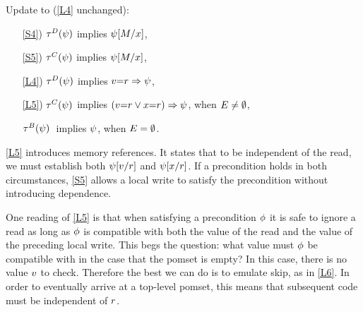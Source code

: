 
\begin{definition}[\xLIR]
  \label{def:pomsets-lir}
  Update  to (\ref{L4} unchanged):
  \begin{enumerate}
  \item[\ref{S4})]
    $\aTr{\bEvs}{\bForm}$ implies $\psi[M/x]$,
  \item[\ref{S5})]
    $\aTr{\cEvs}{\bForm}$ implies $\psi[M/x]$,
  \item[\ref{L4})]
    $\aTr{\bEvs}{\bForm}$ implies $v{=}r\Rightarrow\psi$, 
  \item[\ref{L5})]
    $\aTr{\cEvs}{\bForm}$ implies
    $(v{=}r\lor x{=}r)\Rightarrow\psi$, when $E\neq\emptyset$,
  \item[{\labeltext[L6]{L6)}{L6}}] 
    $\aTr{\dEvs}{\bForm}\;$ implies $\psi$, when $E=\emptyset$.
  \end{enumerate}
\end{definition}

\ref{L5} introduces memory references.  It states that to be independent of
the read, we must establish both $\psi[v/r]$ and $\psi[x/r]$.
If a precondition holds in both circumstances, \ref{S5} allows a local write
to satisfy the precondition without introducing dependence.

One reading of \ref{L5} is that when satisfying a precondition $\phi$ it is
safe to ignore a read as long as $\phi$ is compatible with both the value
of the read and the value of the preceding local write.  This begs the
question: what value must $\phi$ be compatible with in the case that the
pomset is empty?  In this case, there is no value $v$ to check.
Therefore the best we can do is to emulate skip, as in \ref{L6}.  In order to
eventually arrive at a top-level pomset, this means that subsequent code must
be independent of $r$.

